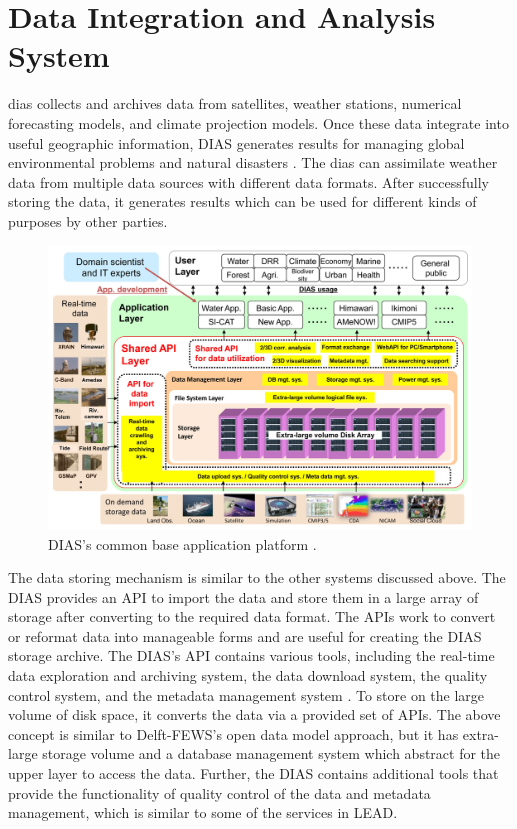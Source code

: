 \section{Data Integration and Analysis System}
\label{se:dias}

\acrfull{dias} \cite{Kawasaki2018DataReduction} collects and archives data from satellites, weather stations, numerical forecasting models, and climate projection models. Once these data integrate into useful geographic information, DIAS generates results for managing global environmental problems and natural disasters \cite{Kawasaki2018DataReduction}. The \acrshort{dias} can assimilate weather data from multiple data sources with different data formats. After successfully storing the data, it generates results which can be used for different kinds of purposes by other parties.

\begin{figure}[htp]
    \centering
    \includegraphics[width=1\textwidth]{lit/other/dias_common_base_application_platform.jpg}
    \caption[DIAS’s common base application platform.]{DIAS’s common base application platform \cite{Kawasaki2018DataReduction}.}
    \label{fi:dias_common_platform}
\end{figure}

The data storing mechanism is similar to the other systems discussed above. The DIAS provides an API to import the data and store them in a large array of storage after converting to the required data format. The APIs work to convert or reformat data into manageable forms and are useful for creating the DIAS storage archive. The DIAS's API contains various tools, including the real-time data exploration and archiving system, the data download system, the quality control system, and the metadata management system \cite{Kawasaki2018DataReduction}. To store on the large volume of disk space, it converts the data via a provided set of APIs. The above concept is similar to Delft-FEWS's open data model approach, but it has extra-large storage volume and a database management system which abstract for the upper layer to access the data. Further, the DIAS contains additional tools that provide the functionality of quality control of the data and metadata management, which is similar to some of the services in LEAD.


